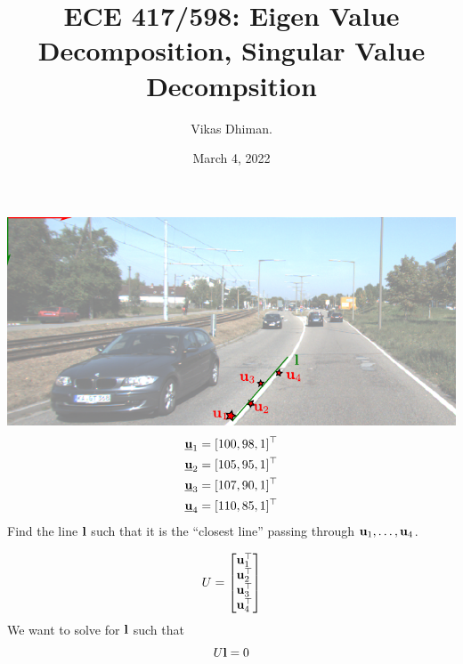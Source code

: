 \documentclass[times,t]{beamer}
\title{ECE 417/598: Eigen Value Decomposition, Singular Value Decompsition }
\author{Vikas Dhiman.  }
\date{March 4, 2022}
\begin{document}
\newcommand{\ubfu}{\underline{\bfu}}
\begin{frame}
  \includegraphics[width=\linewidth]{media/lane-from-points.pdf}
  \begin{align*}
    \ubfu_1 &= [100, 98, 1]^\top\\
    \ubfu_2 &= [105, 95, 1]^\top\\
    \ubfu_3 &= [107, 90, 1]^\top\\
    \ubfu_4 &= [110, 85, 1]^\top
    \end{align*}
    Find  the line $\mathbf{l}$ such that it is the ``closest line'' passing through
    $\mathbf{u}_1, \dots, \mathbf{u}_4$.
\end{frame}

\begin{frame}
  \[
  U = \begin{bmatrix}\mathbf{u}_1^\top  \\
    \mathbf{u}_2^\top \\
    \mathbf{u}_3^\top \\
    \mathbf{u}_4^\top
  \end{bmatrix}
  \]
  We want to solve for $\mathbf{l}$ such that
  \[
    U \mathbf{l} = 0
  \]
\end{frame}
\end{document}
